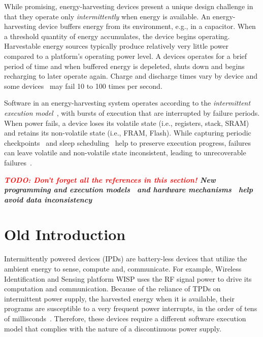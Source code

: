 \documentclass[sigconf,anonymous,review]{acmart}
\newcommand{\TODO}[1]{\bf \em \textcolor{red}{TODO: #1}\xspace}
\begin{document}
While promising, energy-harvesting devices present a unique design challenge in
that they operate only {\em intermittently} when energy is available.   An
energy-harvesting device buffers energy from its environment, e.g., in a
capacitor. When a threshold quantity of energy accumulates, the device begins
operating.  Harvestable energy sources typically produce relatively very little
power compared to a platform's operating power level.  A devices operates for a
brief period of time and when buffered energy is depeleted, shuts down and
begins recharging to later operate again.  Charge and discharge times vary by
device and some devices~\cite{wisp} may fail 10 to 100 times per second.

Software in an energy-harvesting system operates according to the {\em
intermittent execution model}~\cite{dino}, with bursts of execution that are
interrupted by failure periods. When power fails, a device loses its volatile
state (i.e., registers, stack, SRAM) and retains its non-volatile state (i.e.,
FRAM, Flash). While capturing periodic checkpoints~\cite{mementos,tictpl,quickrecall}
and sleep scheduling~\cite{dewdrop,hibernus,hibernusplusplus} help to preserve
execution progress, failures can leave volatile and non-volatile state inconsistent,
leading to unrecoverable failures~\cite{mspcdino,edb,edbtoppicks}.  

\TODO{Don't forget all the references in this section!}
New programming and execution models~\cite{dino,ratchet,chain,alpaca} and hardware
mechanisms~\cite{clank, idetic} help avoid data inconsistency

\section{Old Introduction}
	Intermittently powered devices (IPDs) are battery-less devices that utilize the ambient energy to sense, compute and, communicate. For example, Wireless Identification and Sensing platform WISP \cite{wisp} uses the RF signal power to drive its computation and communication. Because of the reliance of TPDs on intermittent power supply, the harvested energy when it is available, their programs are susceptible to a very frequent power interrupts, in the order of tens of millisconds~\cite{}. Therefore, these devices require a different software execution model that complies with the nature of a discontinuous power supply. 
\end{document}
